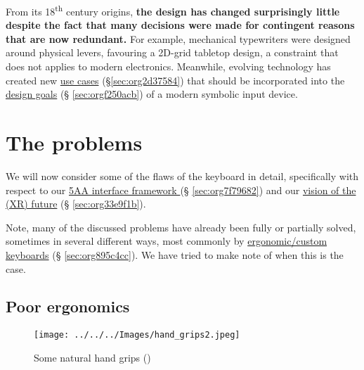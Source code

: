 \documentclass[logo,bsc,singlespacing,parskip]{infthesis}
\begin{document}
From its 18\textsuperscript{th} century origins, \textbf{the design has changed surprisingly little despite the fact that many decisions were made for contingent reasons that are now redundant.}
For example, mechanical typewriters were designed around physical levers, favouring a 2D-grid tabletop design, a constraint that does not applies to modern electronics.
Meanwhile, evolving technology has created new \hyperref[sec:org2d37584]{use cases} (\S \ref{sec:org2d37584}) that should be incorporated into the \hyperref[sec:orgf250acb]{design goals} (§ \ref{sec:orgf250acb}) of a modern symbolic input device.
\section{The problems}
\label{sec:org9338bc4}
We will now consider some of the flaws of the keyboard in detail, specifically with respect to our  \hyperref[sec:org7f79682]{5AA interface framework } (§ \ref{sec:org7f79682}) and our \hyperref[sec:org33e9f1b]{vision of the (XR) future} (§ \ref{sec:org33e9f1b}).

Note, many of the discussed problems have already been fully or partially solved, sometimes in several different ways, most commonly by \hyperref[sec:org895c4cc]{ergonomic/custom keyboards} (§ \ref{sec:org895c4cc}).
We have tried to make note of when this is the case.
\subsection{Poor ergonomics}
\label{sec:orga6aecc9}
\begin{figure}[h]
\centering
\texttt{[image: ../../../Images/hand\_grips2.jpeg]}
\caption{\label{fig:hand_grips}Some natural hand grips (\autocite{victorBriefRantFuture})}
\end{figure}
\end{document}

